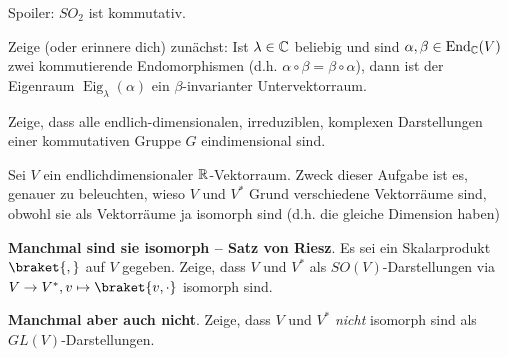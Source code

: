 \begin{sheet}
\begin{problem}[title={Was geht bei $SO_2$ schief?}]
Spoiler: $SO_2$ ist kommutativ.

\begin{subproblem}
Zeige (oder erinnere dich) zunächst: Ist $\lambda\in\mathbb{C}$ beliebig und sind $\alpha,\beta\in\operatorname{End}_{\mathbb{C}}(V)$ zwei kommutierende Endomorphismen (d.h. $\alpha\circ\beta=\beta\circ\alpha$), dann ist der Eigenraum $\operatorname{Eig}_\lambda(\alpha)$ ein $\beta$-invarianter Untervektorraum.
\end{subproblem}
\begin{subproblem}
Zeige, dass alle endlich-dimensionalen, irreduziblen, komplexen Darstellungen einer kommutativen Gruppe $G$ eindimensional sind.
\end{subproblem}
\end{problem}

\begin{problem}[title={Isomorphie von $V$ und $V^\ast$}]
Sei $V$ ein endlichdimensionaler $\mathbb{R}$-Vektorraum. Zweck dieser Aufgabe ist es, genauer zu beleuchten, wieso $V$ und $V^\ast$ Grund verschiedene Vektorräume sind, obwohl sie als Vektorräume ja isomorph sind (d.h. die gleiche Dimension haben)
\begin{subproblem}
\textbf{Manchmal sind sie isomorph -- Satz von Riesz}.
Es sei ein Skalarprodukt $\braket{,}$ auf $V$ gegeben. Zeige, dass $V$ und $V^\ast$ als $SO(V)$-Darstellungen via $V\to V^\ast, v\mapsto \braket{v,\cdot}$ isomorph sind.
\end{subproblem}
\begin{subproblem}[difficulty={schwerer als man denkt}]
\textbf{Manchmal aber auch nicht}.
Zeige, dass $V$ und $V^\ast$ \emph{nicht} isomorph sind als $GL(V)$-Darstellungen.
\end{subproblem}
\end{problem}
	
\end{sheet}
